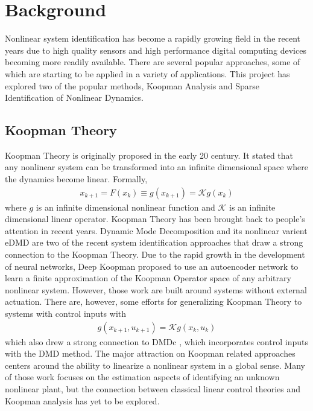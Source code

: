 \documentclass[10pt,twocolumn]{article}
\begin{document}
\section{Background}

Nonlinear system identification has become a rapidly growing field in the recent years due to
high quality sensors and high performance digital computing
devices becoming more readily available.
There are several popular approaches, some of which are starting to be applied in a
variety of applications.
This project has explored two of the popular methods, Koopman Analysis and Sparse
Identification of Nonlinear Dynamics.

\subsection{Koopman Theory}
Koopman Theory is originally proposed in the early 20 century. It stated that any nonlinear
system can be transformed into an infinite dimensional space where the dynamics become
linear. Formally,
\begin{gather}\label{eqa:koopman}
  x_{k+1} = F(x_k) \equiv
  g(x_{k+1}) = \mathcal{K} g(x_k)
\end{gather}
where $g$ is an infinite dimensional nonlinear function and $\mathcal{K}$ is an
infinite dimensional linear operator. Koopman Theory has been brought back to people's
attention in recent years. Dynamic Mode Decomposition \cite{dmd} and its nonlinear
varient eDMD \cite{edmd} are two of the recent system identification approaches that
draw a strong connection to the Koopman Theory. Due to the rapid growth in the development
of neural networks, Deep Koopman \cite{deepkoopman} proposed to use an autoencoder network to learn
a finite approximation of the Koopman Operator space of any arbitrary nonlinear system.
However, those work are built around systems without external actuation.
There are, however, some efforts \cite{generalkoopman}
for generalizing Koopman Theory to systems with control inputs with
\begin{gather}\label{eqa:koopman_ctrl}
  g(x_{k+1}, u_{k+1}) = \mathcal{K}g(x_k, u_k)
\end{gather}
which also drew a strong connection to DMDc \cite{dmdc}, which incorporates
control inputs with the
DMD method. The major attraction on Koopman related approaches centers around the ability
to linearize a nonlinear system in a global sense. Many of those work focuses on the estimation
aspects of identifying an unknown nonlinear plant, but the connection between classical
linear control theories and Koopman analysis has yet to be explored.
\end{document}
